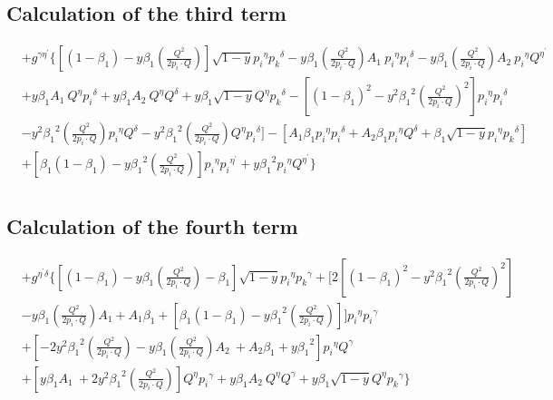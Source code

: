 \subsection*{Calculation of the third term}
\begin{equation}
\begin{split} 
&+g^{{{\gamma}}{{\eta}^{\prime}}}\lbrace [(1-\beta_1)-y\beta_1 (\frac{Q^2}{2p_i \cdot Q})] \sqrt{1-y}{p_i}^{{\eta}}{{p_k}^{{\delta}}}-y {\beta_1} (\frac{Q^2}{2p_i \cdot Q}) A_1 \:{p_i}^{{\eta}}{p_i}^{{\delta}}
-y {\beta_1} (\frac{Q^2}{2p_i \cdot Q}) A_2\: {p_i}^{{\eta}}{Q}^{{\eta}^{\prime}}\\
&+y {\beta_1} A_1 \:{Q}^{{\eta}}{p_i}^{{\delta}}+y {\beta_1} A_2 \:{Q}^{{\eta}}{Q}^{{\delta}}+y {\beta_1}\sqrt{1-y}{Q}^{{\eta}}{{p_k}^{{\delta}}}-[(1-\beta_1)^2-y^2 {\beta_1}^2 (\frac{Q^2}{2p_i \cdot Q})^2] {p_i}^{{\eta}}{p_i}^{{\delta}}\\&-y^2 {\beta_1}^2 (\frac{Q^2}{2p_i \cdot Q}){p_i}^{{\eta}}{Q}^{{\delta}}-y^2 {\beta_1}^2 (\frac{Q^2}{2p_i \cdot Q}){Q}^{{\eta}}{p_i}^{{\delta}}]-[A_1\beta_1 {p_i}^{{\eta}}{{p_i}^{{\delta}}}+A_2\beta_1 {p_i}^{{\eta}}{{Q}^{{\delta}}}+\beta_1 \sqrt{1-y}{p_i}^{{\eta}}{{p_k}^{{\delta}}}]\\
&+[\beta_1(1-\beta_1)-y {\beta_1}^2 (\frac{Q^2}{2p_i \cdot Q})] {p_i}^{{\eta}}{p_i}^{{\eta}^{\prime}}+y {\beta_1}^2 {p_i}^{{\eta}}{Q}^{{\eta}^{\prime}}\rbrace\\
\end{split}
\end{equation}

\subsection*{Calculation of the fourth term}

\begin{equation}
\begin{split} 
&+g^{{{\eta}^{\prime}}{{\delta}}}\lbrace [(1-\beta_1)-y\beta_1 (\frac{Q^2}{2p_i \cdot Q})-\beta_1] \sqrt{1-y}{p_i}^{{\eta}}{{p_k}^{{\gamma}}}+[2[(1-\beta_1)^2-y^2 {\beta_1}^2 (\frac{Q^2}{2p_i \cdot Q})^2]\\
&-y {\beta_1} (\frac{Q^2}{2p_i \cdot Q}) A_1 +A_1\beta_1 +[\beta_1(1-\beta_1)-y {\beta_1}^2 (\frac{Q^2}{2p_i \cdot Q})]] {p_i}^{{\eta}}{p_i}^{{\gamma}}\\
& +[-2y^2 {\beta_1}^2 (\frac{Q^2}{2p_i \cdot Q})-y {\beta_1} (\frac{Q^2}{2p_i \cdot Q}) A_2\:+A_2\beta_1 +y {\beta_1}^2] {p_i}^{{\eta}}{Q}^{{\gamma}}\\
&+[y {\beta_1} A_1 \:+2y^2 {\beta_1}^2 (\frac{Q^2}{2p_i \cdot Q})]{Q}^{{\eta}}{p_i}^{{\gamma}}+y {\beta_1} A_2 \:{Q}^{{\eta}}{Q}^{{\gamma}}+y {\beta_1}\sqrt{1-y}{Q}^{{\eta}}{{p_k}^{{\gamma}}}
\rbrace\\
\end{split}
\end{equation}

